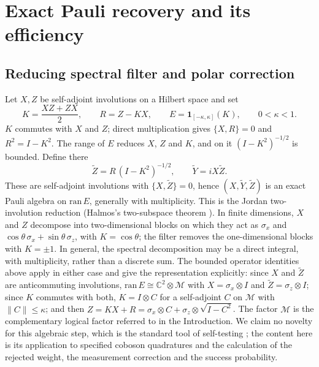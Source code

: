 \documentclass[11pt,a4paper]{article}
\newcommand{\Zt}{\widetilde Z}
\newcommand{\Yt}{\widetilde Y}
\begin{document}
\section{Exact Pauli recovery and its efficiency}
\label{sec:recovery}

\subsection{Reducing spectral filter and polar correction}

Let $X,Z$ be self-adjoint involutions on a Hilbert space and set
\begin{equation}
K=\frac{XZ+ZX}{2},\qquad R=Z-KX,\qquad E=\mathbf 1_{[-\kappa,\kappa]}(K),\qquad 0<\kappa<1 .
\label{eq:KRE}
\end{equation}
$K$ commutes with $X$ and $Z$; direct multiplication gives $\{X,R\}=0$ and $R^2=I-K^2$. The range of $E$ reduces $X$, $Z$ and $K$, and on it $(I-K^2)^{-1/2}$ is bounded. Define there
\begin{equation}
\Zt=R\,(I-K^2)^{-1/2},\qquad \Yt=iX\Zt .
\label{eq:polar}
\end{equation}
These are self-adjoint involutions with $\{X,\Zt\}=0$, hence $(X,\Yt,\Zt)$ is an exact Pauli algebra on $\mathrm{ran}\,E$, generally with multiplicity. This is the Jordan two-involution reduction (Halmos's two-subspace theorem \cite{Halmos1969}). In finite dimensions, $X$ and $Z$ decompose into two-dimensional blocks on which they act as $\sigma_x$ and $\cos\theta\,\sigma_x+\sin\theta\,\sigma_z$, with $K=\cos\theta$; the filter removes the one-dimensional blocks with $K=\pm1$. In general, the spectral decomposition may be a direct integral, with multiplicity, rather than a discrete sum. The bounded operator identities above apply in either case and give the representation explicitly: since $X$ and $\Zt$ are anticommuting involutions, $\mathrm{ran}\,E\cong\mathbb C^2\otimes\mathcal M$ with $X=\sigma_x\otimes I$ and $\Zt=\sigma_z\otimes I$; since $K$ commutes with both, $K=I\otimes C$ for a self-adjoint $C$ on $\mathcal M$ with $\|C\|\le\kappa$; and then $Z=KX+R=\sigma_x\otimes C+\sigma_z\otimes\sqrt{I-C^2}$. The factor $\mathcal M$ is the complementary logical factor referred to in the Introduction. We claim no novelty for this algebraic step, which is the standard tool of self-testing \cite{Masanes2005,Kaniewski2016,Supic2020}; the content here is its application to specified coboson quadratures and the calculation of the rejected weight, the measurement correction and the success probability.
\end{document}
